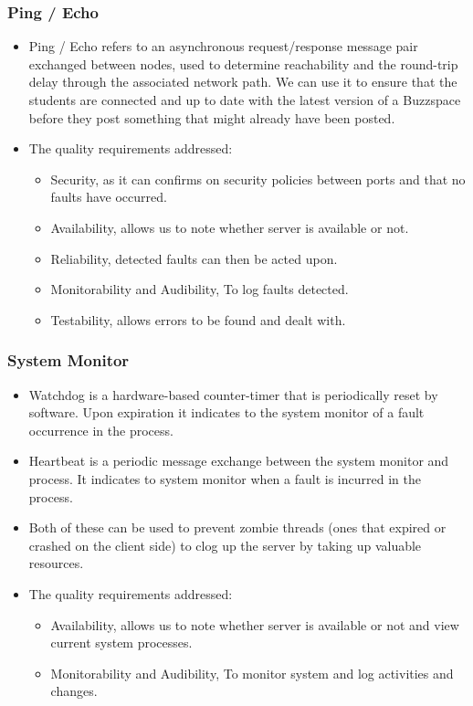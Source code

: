 \documentclass[12pt, oneside]{article}
\begin{document}
		\subsubsection{Ping / Echo}			
			\begin{itemize}		
				\item Ping / Echo refers to an asynchronous request/response message pair exchanged between nodes, used to determine reachability and the round-trip delay through the associated network path. We can use it to ensure that the students are connected and up to date with the latest version of a Buzzspace before they post something that might already have been posted.
				\item The quality requirements addressed:
					\begin{itemize}
						\item Security, as it can confirms on security policies between ports and that no faults have occurred.
						\item Availability, allows us to note whether server is available or not.
						\item Reliability, detected faults can then be acted upon. 
						\item Monitorability and Audibility, To log faults detected.
						\item Testability, allows errors to be found and dealt with.
					\end{itemize}
			\end{itemize}
			
		\subsubsection{System Monitor}
			\begin{itemize}
				\item Watchdog is a hardware-based counter-timer that is periodically reset by software. Upon expiration it indicates to the system monitor of a fault occurrence in the process.
				
				\item Heartbeat is a periodic message exchange between the system monitor and process. It indicates to system monitor when a fault is incurred in the process.
				
				\item Both of these can be used to prevent zombie threads (ones that expired or crashed on the client side) to clog up the server by taking up valuable resources.
				
				\item The quality requirements addressed:
				\begin{itemize}
					\item Availability, allows us to note whether server is available or not and view current system processes.
					\item Monitorability and Audibility, To monitor system and log activities and changes.
				\end{itemize}
			\end{itemize}	
\end{document}
